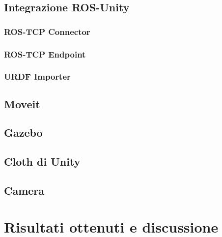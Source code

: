 \documentclass[11pt]{report}
\begin{document}

\section{Integrazione ROS-Unity}

\subsection{ROS-TCP Connector}
\subsection{ROS-TCP Endpoint }
\subsection{URDF Importer}

\section{Moveit}

\section{Gazebo}

\section{Cloth di Unity}

\section{Camera}

\chapter{Risultati ottenuti e discussione}

\end{document}
